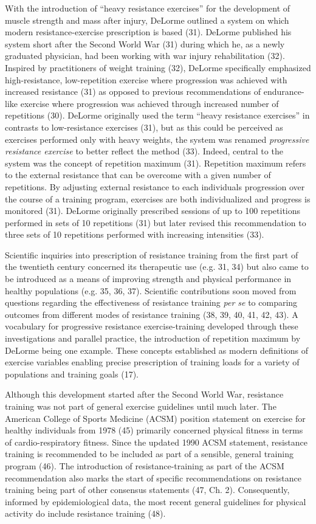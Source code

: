 \documentclass[twoside,10pt]{gihclass} %
\begin{document}
With the introduction of ``heavy resistance exercises'' for the development of muscle strength and mass after injury, DeLorme outlined a system on which modern resistance-exercise prescription is based (31).
DeLorme published his system short after the Second World War (31)
during which he, as a newly graduated physician, had been working with war injury rehabilitation
(32).
Inspired by practitioners of weight training (32),
DeLorme specifically emphasized high-resistance, low-repetition exercise where progression was achieved with increased resistance (31) as opposed to previous recommendations of endurance-like exercise where progression was achieved through increased number of repetitions
(30).
DeLorme originally used the term ``heavy resistance exercises'' in contrasts to low-resistance exercises (31), but as this could be perceived as exercises performed only with heavy weights, the system was renamed \emph{progressive resistance exercise} to better reflect the method
(33).
Indeed, central to the system was the concept of repetition maximum (31).
Repetition maximum refers to the external resistance that can be overcome with a given number of repetitions. By adjusting external resistance to each individuals progression over the course of a training program, exercises are both individualized and progress is monitored (31).
DeLorme originally prescribed sessions of up to 100 repetitions performed in sets of 10 repetitions (31) but later revised this recommendation to three sets of 10 repetitions performed with increasing intensities
(33).

Scientific inquiries into prescription of resistance training from the first part of the twentieth century concerned its therapeutic use
(e.g. 31, 34)
but also came to be introduced as a means of improving strength and physical performance in healthy populations
(e.g. 35, 36, 37).
Scientific contributions soon moved from questions regarding the effectiveness of resistance training \emph{per se} to comparing outcomes from different modes of resistance training
(38, 39, 40, 41, 42, 43).
A vocabulary for progressive resistance exercise-training developed through these investigations and parallel practice,
the introduction of repetition maximum by DeLorme being one example. These concepts established as modern definitions of exercise variables enabling precise prescription of training loads for a variety of populations and training goals
(17).

Although this development started after the Second World War, resistance training was not part of general exercise guidelines until much later.
The American College of Sports Medicine (ACSM) position statement on exercise for healthy individuals from 1978 (45)
primarily concerned physical fitness in terms of cardio-respiratory fitness.
Since the updated 1990 ACSM statement, resistance training is recommended to be included as part of a sensible, general training program (46).
The introduction of resistance-training as part of the ACSM recommendation also marks the start of specific recommendations on resistance training being part of other consensus statements
(47, Ch. 2).
Consequently, informed by epidemiological data, the most recent general guidelines for physical activity do include resistance training (48).
\end{document}
